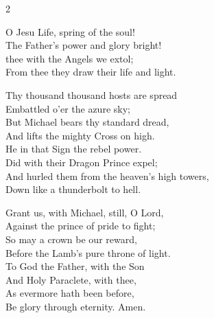 \documentclass[12pt]{book}
\begin{document}
\myrule

   
   \myrule


\chapterlateng



\hymnlateng


\begin{multicols}{2}
\raggedcolumns
\begin{enpars}
O Jesu Life, spring of the soul!\\
The Father's power and glory bright!\\
thee with the Angels we extol;\\
From thee they draw their life and light.

Thy thousand thousand hosts are spread\\
Embattled o'er the azure sky;\\
But Michael bears thy standard dread,\\
And lifts the mighty Cross on high.\\

He in that Sign the rebel power.\\
Did with their Dragon Prince expel;\\
And hurled them from the heaven's high towers,\\
Down like a thunderbolt to hell.

Grant us, with Michael, still, O Lord,\\
Against the prince of pride to fight;\\
So may a crown be our reward,\\
Before the Lamb's pure throne of light.\\

To God the Father, with the Son\\
And Holy Paraclete, with thee,\\
As evermore hath been before,\\
Be glory through eternity. Amen.
\end{enpars}\end{multicols}
\end{document}
